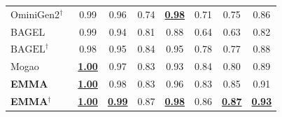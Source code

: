 \documentclass[11pt]{article}
\begin{document}
\begin{table}[htbp]
{\begin{tabular}{l|cccccc|c}
            {OminiGen2}$^{\dagger}$~ & 0.99 & 0.96 & 0.74 & \underline{\textbf{0.98}} & 0.71 & 0.75 & 0.86 \\
            BAGEL~ & 0.99 & 0.94 & 0.81 & 0.88 & 0.64 & 0.63 & 0.82 \\
            $\text{BAGEL}^{\dagger}$~ & 0.98 & 0.95 & 0.84 & 0.95 & 0.78 & 0.77 & 0.88 \\
            Mogao~ & \underline{\textbf{1.00}} & 0.97 & 0.83 & 0.93 & 0.84 & 0.80 & 0.89 \\
            \midrule
            \textbf{EMMA} & \underline{\textbf{1.00}} & 0.98 & 0.83 & 0.96 & 0.83 & 0.85 & 0.91 \\            \textbf{EMMA}$^{\dagger}$ & \underline{\textbf{1.00}} & \underline{\textbf{0.99}} & 0.87 & \underline{\textbf{0.98}} & 0.86 & \underline{\textbf{0.87}} & \underline{\textbf{0.93}} \\
            \bottomrule
        \end{tabular}
}
\end{table}
\end{document}
